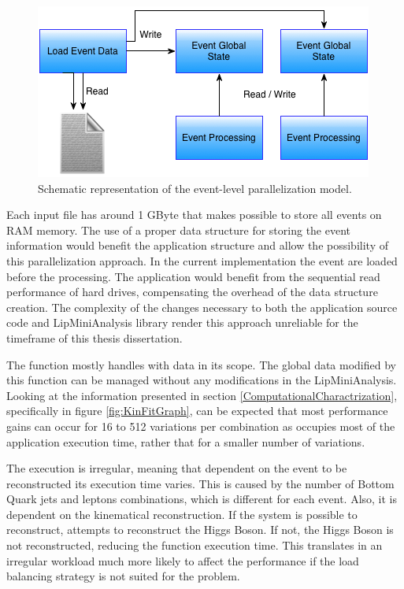 \begin{figure}[!htp]
	\begin{center}
		\includegraphics[scale=0.7]{../../common/img/2global_states_par.png}
		\caption{Schematic representation of the event-level parallelization model.}
		\label{fig:EventParallelization}
	\end{center}
\end{figure}

Each input file has around 1 GByte that makes possible to store all events on RAM memory. The use of a proper data structure for storing the event information would benefit the application structure and allow the possibility of this parallelization approach. In the current implementation the event are loaded before the processing. The application would benefit from the sequential read performance of hard drives, compensating the overhead of the data structure creation. The complexity of the changes necessary to both the application source code and LipMiniAnalysis library render this approach unreliable for the timeframe of this thesis dissertation.

The \ttDilepKinFit function mostly handles with data in its scope. The global data modified by this function can be managed without any modifications in the LipMiniAnalysis. Looking at the information presented in section \ref{ComputationalCharactrization}, specifically in figure \ref{fig:KinFitGraph}, can be expected that most performance gains can occur for 16 to 512 variations per combination as \ttDilepKinFit occupies most of the application execution time, rather that for a smaller number of variations.

The \ttDilepKinFit execution is irregular, meaning that dependent on the event to be reconstructed its execution time varies. This is caused by the number of Bottom Quark jets and leptons combinations, which is different for each event. Also, it is dependent on the kinematical reconstruction. If the \ttbar system is possible to reconstruct, \ttDilepKinFit attempts to reconstruct the Higgs Boson. If not, the Higgs Boson is not reconstructed, reducing the function execution time. This translates in an irregular workload much more likely to affect the performance if the load balancing strategy is not suited for the problem.

